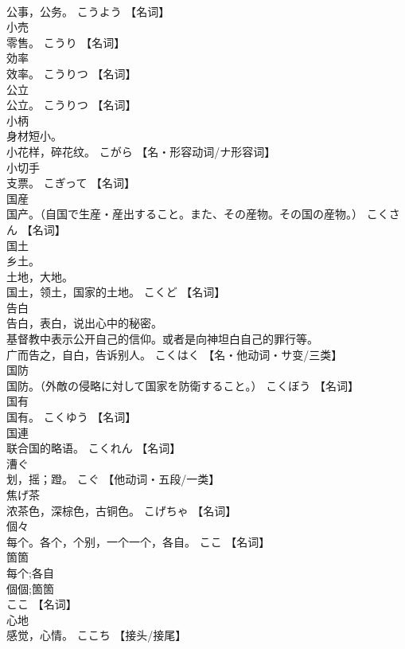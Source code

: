 \documentclass[8pt]{extreport}
\begin{document}
\begin{CJK}{UTF8}{min}
\\	公事，公务。	こうよう		【名词】
\\	小売	
\\	零售。	こうり		【名词】
\\	効率	
\\	效率。	こうりつ		【名词】
\\	公立	
\\	公立。	こうりつ		【名词】
\\	小柄	
\\	身材短小。 
\\	小花样，碎花纹。	こがら		【名・形容动词/ナ形容词】
\\	小切手	
\\	支票。	こぎって		【名词】
\\	国産	
\\	国产。（自国で生産・産出すること。また、その産物。その国の産物。）	こくさん		【名词】
\\	国土	
\\	乡土。 
\\	土地，大地。 
\\	国土，领土，国家的土地。	こくど		【名词】
\\	告白	
\\	告白，表白，说出心中的秘密。 
\\	基督教中表示公开自己的信仰。或者是向神坦白自己的罪行等。 
\\	广而告之，自白，告诉别人。	こくはく		【名・他动词・サ变/三类】
\\	国防	
\\	国防。（外敵の侵略に対して国家を防衛すること。）	こくぼう		【名词】
\\	国有	
\\	国有。	こくゆう		【名词】
\\	国連	
\\	联合国的略语。	こくれん		【名词】
\\	漕ぐ	
\\	划，摇；蹬。	こぐ		【他动词・五段/一类】
\\	焦げ茶	
\\	浓茶色，深棕色，古铜色。	こげちゃ		【名词】
\\	個々	
\\	每个。各个，个别，一个一个，各自。	ここ		【名词】
\\	箇箇	
\\	每个;各自 
\\	個個;箇箇 
\\	ここ		【名词】
\\	心地	
\\	感觉，心情。	ここち		【接头/接尾】

\end{CJK}
\end{document}
